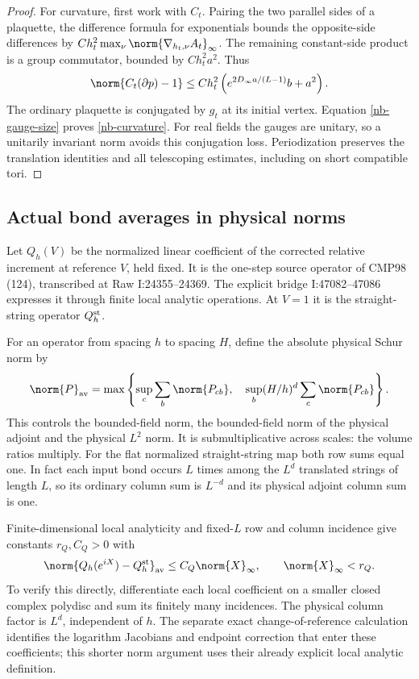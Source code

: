 \begin{proof}
For curvature, first work with $C_t$. Pairing the two parallel
sides of a plaquette, the difference formula for exponentials
bounds the opposite-side differences by
$Ch_t^2\max_\nu\norm{\nabla_{h_t,\nu}A_t}_\infty$.
The remaining constant-side product is a group commutator,
bounded by $Ch_t^2a^2$. Thus
\[
 \norm{C_t(\partial p)-1}
 \le Ch_t^2\left(e^{2D_\infty a/(L-1)}b+a^2\right).
\]
The ordinary plaquette is conjugated by $g_t$ at its initial
vertex. Equation \eqref{nb-gauge-size} proves
\eqref{nb-curvature}. For real fields the gauges are unitary,
so a unitarily invariant norm avoids this conjugation loss.
Periodization preserves the translation identities and all
telescoping estimates, including on short compatible tori.
\end{proof}

\subsection{Actual bond averages in physical norms}

Let $Q_h(V)$ be the normalized linear coefficient of the
corrected relative increment at reference $V$, held fixed.
It is the one-step source operator of CMP98 (124), transcribed
at Raw I:24355--24369. The explicit bridge I:47082--47086
expresses it through finite local analytic operations. At $V=1$
it is the straight-string operator $Q_h^{\rm st}$.

For an operator from spacing $h$ to spacing $H$, define the
absolute physical Schur norm by
\begin{equation}\label{nb-av-norm}
 \norm{P}_{\rm av}
 =\max\left\{
       \sup_c\sum_b\norm{P_{cb}},\quad
       \sup_b(H/h)^d\sum_c\norm{P_{cb}}\right\}.
\end{equation}
This controls the bounded-field norm, the bounded-field norm
of the physical adjoint and the physical $L^2$ norm. It is
submultiplicative across scales: the volume ratios multiply.
For the flat normalized straight-string map both row sums
equal one. In fact each input bond occurs $L$ times among
the $L^d$ translated strings of length $L$, so its ordinary
column sum is $L^{-d}$ and its physical adjoint column sum
is one.

Finite-dimensional local analyticity and fixed-$L$ row and
column incidence give constants $r_Q,C_Q>0$ with
\begin{equation}\label{nb-local-Q-difference}
 \norm{Q_h(e^{iX})-Q_h^{\rm st}}_{\rm av}
             \le C_Q\norm{X}_\infty,
                 \qquad\norm{X}_\infty<r_Q.
\end{equation}
To verify this directly, differentiate each local coefficient
on a smaller closed complex polydisc and sum its finitely many
incidences. The physical column factor is $L^d$, independent
of $h$. The separate exact change-of-reference calculation
identifies the logarithm Jacobians and endpoint correction
that enter these coefficients; this shorter norm argument
uses their already explicit local analytic definition.


